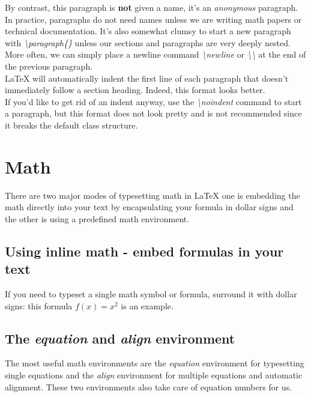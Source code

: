 \documentclass[11pt]{article}  %
\begin{document}
        By contrast, this paragraph is \textbf{not} given a name, it's an \textit{anonymous} paragraph. In practice, paragraphs do not need names unless we are writing math papers or technical documentation. It's also somewhat clumsy to start a new paragraph with \textit{\textbackslash paragraph\{\}} unless our sections and paragraphs are very deeply nested. More often, we can simply place a newline command \textit{\textbackslash newline} or \textit{\textbackslash \textbackslash} at the end of the previous paragraph.\\

        LaTeX will automatically indent the first line of each paragraph that doesn't immediately follow a section heading. Indeed, this format looks better.\\

        \noindent If you'd like to get rid of an indent anyway, use the \textit{\textbackslash noindent} command to start a paragraph, but this format does not look pretty and is not recommended since it breaks the default class structure.


  \section{Math}
    There are two major modes of typesetting math in LaTeX one is embedding the math directly into your text by encapsulating your formula in dollar signs and the other is using a predefined math environment.

    \subsection{Using inline math - embed formulas in your text}
      If you need to typeset a single math symbol or formula, surround it with dollar signs: this formula $f(x) = x^2$ is an example.

    \subsection{The \textit{equation} and \textit{align} environment}
      The most useful math environments are the \textit{equation} environment for typesetting single equations and the \textit{align} environment for multiple equations and automatic alignment. These two environments also take care of equation numbers for us.\\
\end{document}
